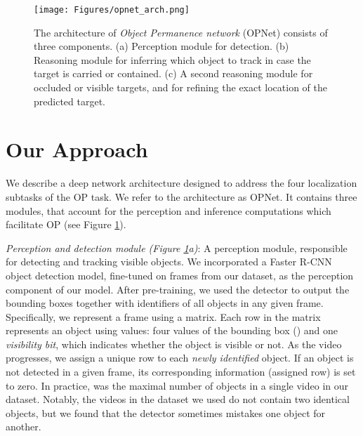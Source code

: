 \documentclass[]{llncs}
\newcommand{\figref}[1]{Figure \ref{#1}}
\begin{document}
\begin{figure}[t]
    \begin{center}
    \texttt{[image: Figures/opnet\_arch.png]}
    \caption{The architecture of \textit{Object Permanence network} (OPNet) consists of three components. (a) Perception module for detection. (b) Reasoning module for inferring which object to track in case the target is carried or contained. (c) A second reasoning module for occluded or visible targets, and for refining the exact location of the predicted target.
    \label{fig:opnet_arch}}
    \end{center}
\end{figure}

\newpage
\section{Our Approach} 
\label{sec:model}
We describe a deep network architecture designed to address the four localization subtasks of the OP task. We refer to the architecture as OPNet. It contains three modules, that account for the perception and inference computations which facilitate OP (see \figref{fig:opnet_arch}).

\textit{Perception and detection module (\figref{fig:opnet_arch}a)}: A perception module, responsible for detecting and tracking visible objects. We incorporated a Faster R-CNN  \cite{ren2015faster} object detection model, fine-tuned on frames from our dataset, as the perception component of our model. 
After pre-training, we used the detector to output the bounding boxes together with identifiers of all objects in any given frame. Specifically, we represent a frame using a   matrix. Each row in the matrix represents an object using  values: four values of the bounding box () and one {\em visibility bit}, which indicates whether the object is visible or not.
As the video progresses, we assign a unique row to each \emph{newly identified} object. If an object is not detected in a given frame, its corresponding information (assigned row) is set to zero. In practice,  was the maximal number of objects in a single video in our dataset.
Notably, the videos in the dataset we used do not contain two identical objects, but we found that the detector sometimes mistakes one object for another.
\end{document}
